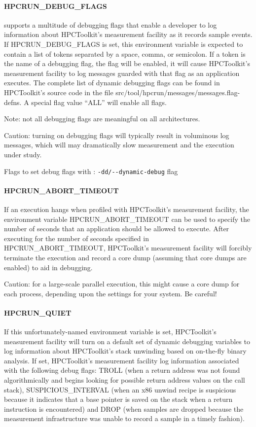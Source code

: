 \paragraph{HPCRUN\_DEBUG\_FLAGS}

\HPCToolkit{} supports a multitude of debugging flags that enable a
developer to log information about HPCToolkit's measurement facility
as it records sample events. If HPCRUN\_DEBUG\_FLAGS is set, this
environment variable is expected to contain a list of tokens separated
by a space, comma, or semicolon. If a token is the name of a debugging
flag, the flag will be enabled, it will cause HPCToolkit's measurement
facility to log messages guarded with that flag as an application
executes. The complete list of dynamic debugging flags can be found
in HPCToolkit's source code in the file
src/tool/hpcrun/messages/messages.flag-defns. A special flag value
“ALL” will enable all flags. 

\parg
Note: not all debugging flags are
meaningful on all architectures. 

\parg 
Caution: turning on debugging flags
will typically result in voluminous log messages, which will may
dramatically slow measurement and the execution under study.

\parg
Flags to set debug flags with \hpcrun: \verb|-dd/--dynamic-debug| flag

\paragraph{HPCRUN\_ABORT\_TIMEOUT}

If an execution hangs when profiled with HPCToolkit's measurement
facility, the environment variable HPCRUN\_ABORT\_TIMEOUT can be
used to specify the number of seconds that an application should
be allowed to execute. After executing for the number of seconds
specified in HPCRUN\_ABORT\_TIMEOUT, HPCToolkit's measurement
facility will forcibly terminate the execution and record a core
dump (assuming that core dumps are enabled) to aid in debugging.

\parg
Caution: for a large-scale parallel execution, this might cause a
core dump for each process, depending upon the settings for your
system. Be careful!

\paragraph{HPCRUN\_QUIET}

If this unfortunately-named environment variable is set, HPCToolkit's
measurement facility will turn on a default set of dynamic debugging
variables to log information about HPCToolkit's stack unwinding
based on on-the-fly binary analysis. If set, HPCToolkit's measurement
facility log information associated with the following debug flags:
TROLL (when a return address was not found algorithmically
and \HPCToolkit{} begins looking for possible return address values
on the call stack), SUSPICIOUS\_INTERVAL (when an x86 unwind recipe
is suspicious because it indicates that a base pointer is saved on
the stack when a return instruction is encountered) and DROP (when
samples are dropped because the measurement infrastructure was
unable to record a sample in a timely fashion).

